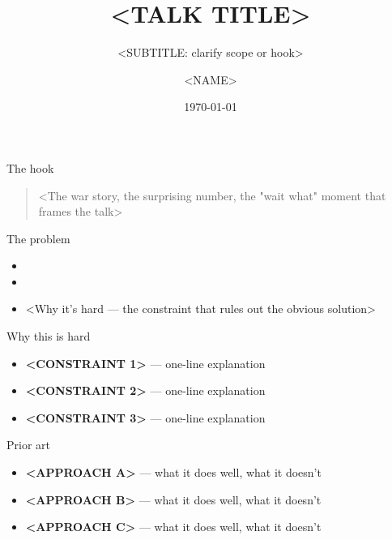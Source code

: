 \documentclass[aspectratio=169,12pt]{beamer}
\title[<SHORT TITLE>]{<TALK TITLE>}
\subtitle{<SUBTITLE: clarify scope or hook>}
\author[<SHORT-NAME>]{<NAME>}
\institute[<ORG>]{<ROLE> @ <ORG>\\<VENUE>}
\date{\today}
\begin{document}
\begin{frame}[plain]
  \titlepage
\end{frame}

\begin{frame}{The hook}
  \vfill
  \begin{quote}
    \Large <The war story, the surprising number, the "wait what" moment that frames the talk>
  \end{quote}
  \vfill
\end{frame}

\begin{frame}{The problem}
  \begin{itemize}
    \item <One-sentence problem statement>
    \item <Why it matters --- who feels the pain, how often, how bad>
    \item <Why it's hard --- the constraint that rules out the obvious solution>
  \end{itemize}
\end{frame}

\begin{frame}{Why this is hard}
  \begin{itemize}
    \item \textbf{<CONSTRAINT 1>} --- one-line explanation
    \item \textbf{<CONSTRAINT 2>} --- one-line explanation
    \item \textbf{<CONSTRAINT 3>} --- one-line explanation
  \end{itemize}
\end{frame}

\begin{frame}{Prior art}
  \begin{itemize}
    \item \textbf{<APPROACH A>} --- what it does well, what it doesn't
    \item \textbf{<APPROACH B>} --- what it does well, what it doesn't
    \item \textbf{<APPROACH C>} --- what it does well, what it doesn't
  \end{itemize}
\end{frame}
\end{document}
